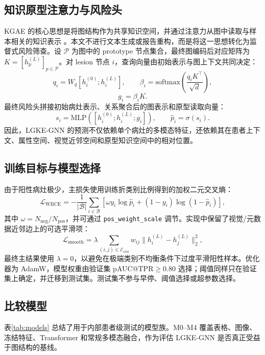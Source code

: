\documentclass[UTF8,a4paper,10pt,twocolumn,fontset=fandol]{ctexart}
\newcommand{\modelname}{LGKE-GNN}
\begin{document}
\subsection{知识原型注意力与风险头}
KGAE 的核心思想是将图结构作为共享知识空间，并通过注意力从图中读取与样本相关的知识表示 \cite{liu2021kgae}。本文不进行文本生成或报告重构，而是将这一思想转化为监督式风险筛查。设 $\mathcal{P}$ 为图中的 prototype 节点集合，最终图编码后对应矩阵为 $K=[h_p^{(L)}]_{p\in\mathcal{P}}$。对 lesion 节点 $i$，查询向量由初始表示与图上下文共同决定：
\begin{equation}
    q_i=W_q[h_i^{(0)};h_i^{(L)}],
    \qquad
    \beta_i=\mathrm{softmax}\left(\frac{q_iK^\top}{\sqrt{d}}\right),
\end{equation}
\begin{equation}
    g_i=\beta_iK.
\end{equation}
最终风险头拼接初始病灶表示、关系聚合后的图表示和原型读取向量：
\begin{equation}
    s_i=\mathrm{MLP}\left([h_i^{(0)};h_i^{(L)};g_i]\right),\qquad
    \hat{p}_i=\sigma(s_i).
\end{equation}
因此，\modelname{} 的预测不仅依赖单个病灶的多模态特征，还依赖其在患者上下文、属性空间、视觉近邻空间和原型知识空间中的相对位置。

\subsection{训练目标与模型选择}
由于阳性病灶极少，主损失使用训练折类别比例得到的加权二元交叉熵：
\begin{equation}
\mathcal{L}_{\mathrm{WBCE}}
=-\frac{1}{|\mathcal{B}|}\sum_{i\in\mathcal{B}}
\left[
\omega y_i\log \hat{p}_i+
(1-y_i)\log(1-\hat{p}_i)
\right],
\end{equation}
其中 $\omega=N_{\mathrm{neg}}/N_{\mathrm{pos}}$，并可通过 \texttt{pos\_weight\_scale} 调节。实现中保留了视觉/元数据近邻边上的可选平滑项：
\begin{equation}
    \mathcal{L}_{\mathrm{smooth}}
    =
    \lambda\sum_{(i,j)\in\mathcal{E}_{sim}}w_{ij}\|h_i^{(L)}-h_j^{(L)}\|_2^2,
\end{equation}
最终主结果使用 $\lambda=0$，以避免在极端类别不均衡条件下过度平滑阳性样本。优化器为 AdamW，模型权重由验证集 pAUC@TPR$\geq0.80$ 选择；阈值同样只在验证集上确定，并迁移到测试集。测试集不参与早停、阈值选择或超参数选择。

\subsection{比较模型}
表\ref{tab:models} 总结了用于内部患者级测试的模型族。M0--M4 覆盖表格、图像、冻结特征、Transformer 和常规多模态融合，作为评估 \modelname{} 是否真正受益于图结构的基线。
\end{document}
